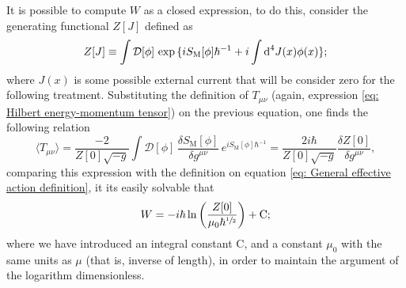 It is possible to compute $W$ as a closed expression, to do this, consider the generating functional $Z[J]$ defined as
\begin{equation}
	Z[J]\equiv \int \mathcal{D}[\phi]\,\exp{\{iS_\text{M}[\phi]\hbar^{-1}+i\int\text{d}^4J(x)\phi(x)\}};
\end{equation}
where $J(x)$ is some possible external current that will be consider zero for the following treatment. Substituting the definition of $T_{\mu\nu}$ (again, expression \ref{eq: Hilbert energy-momentum tensor}) on the previous equation, one finds the following relation
\begin{equation}
	\langle T_{\mu\nu}\rangle=\frac{-2}{Z[0]\sqrt{-g}}\int \mathcal{D}[\phi]\,\frac{\delta S_\text{M}[\phi]}{\delta g^{\mu\nu}}\,e^{iS_\text{M}[\phi]\hbar^{-1}}=\frac{2i\hbar}{Z[0]\sqrt{-g}}\frac{\delta Z[0]}{\delta g^{\mu\nu}},
\end{equation}
comparing this expression with the definition on equation \ref{eq: General effective action definition}, it its easily solvable that
\begin{equation}\label{eq: Effective Action Z[0]}
	W=-i\hbar \ln\left( \frac{Z[0]}{\mu_0\hbar^{\sfrac{1}{2}}}\right)+\text{C};
\end{equation}
where we have introduced an integral constant C, and a constant $\mu_0$ with the same units as $\mu$ (that is, inverse of length), in order to maintain the argument of the logarithm dimensionless.

